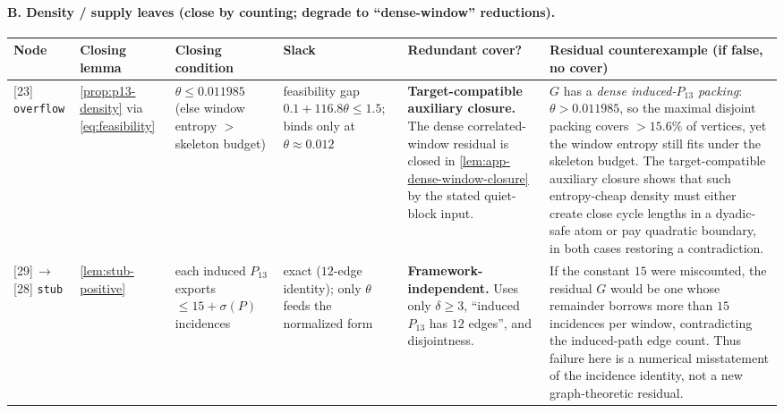 \documentclass[11pt]{article}
\begin{document}
\paragraph{B. Density / supply leaves (close by counting; degrade to ``dense-window'' reductions).}
{\scriptsize\setlength{\tabcolsep}{3pt}
\begin{longtable}{L{0.09\textwidth} L{0.095\textwidth} L{0.15\textwidth} L{0.08\textwidth} L{0.105\textwidth} L{0.335\textwidth}}
\toprule
\textbf{Node} & \textbf{Closing lemma} & \textbf{Closing condition} & \textbf{Slack} & \textbf{Redundant cover?} & \textbf{Residual counterexample (if false, no cover)} \\
\midrule
\endhead
{[23]} \texttt{overflow} & \cref{prop:p13-density} via \cref{eq:feasibility} & $\theta\le0.011985$ (else window entropy $>$ skeleton budget) & feasibility gap $0.1+116.8\theta\le1.5$; binds only at $\theta\approx0.012$ & \textbf{Target-compatible auxiliary closure.} The dense correlated-window residual is closed in \cref{lem:app-dense-window-closure} by the stated quiet-block input. & $G$ has a \emph{dense induced-$P_{13}$ packing}: $\theta>0.011985$, so the maximal disjoint packing covers $>15.6\%$ of vertices, yet the window entropy still fits under the skeleton budget. The target-compatible auxiliary closure shows that such entropy-cheap density must either create close cycle lengths in a dyadic-safe atom or pay quadratic boundary, in both cases restoring a contradiction. \\
{[29]}\,$\to$\,{[28]} \texttt{stub} & \cref{lem:stub-positive} & each induced $P_{13}$ exports $\le15+\sigma(P)$ incidences & exact ($12$-edge identity); only $\theta$ feeds the normalized form & \textbf{Framework-independent.} Uses only $\delta\ge3$, ``induced $P_{13}$ has $12$ edges'', and disjointness. & If the constant $15$ were miscounted, the residual $G$ would be one whose remainder borrows more than $15$ incidences per window, contradicting the induced-path edge count. Thus failure here is a numerical misstatement of the incidence identity, not a new graph-theoretic residual. \\
\bottomrule
\end{longtable}
}
\end{document}
